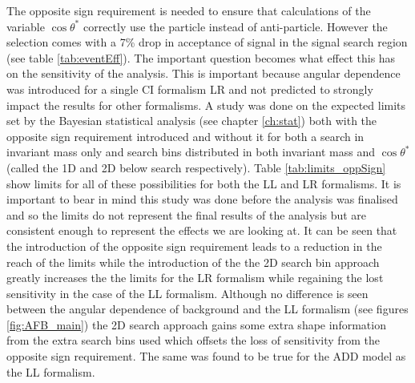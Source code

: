     The opposite sign requirement is needed to ensure that calculations of the variable $\cos{\theta^{*}}$  correctly use the particle instead of anti-particle. However the selection comes with a 7\% drop in acceptance of signal in the signal search region (see table \ref{tab:eventEff}). The important question becomes what effect this has on the sensitivity of the analysis. This is important because angular dependence was introduced for a single CI formalism LR and not predicted to strongly impact the results for other formalisms. 
    A study was done on the expected limits set by the Bayesian statistical analysis (see chapter \ref{ch:stat}) both with the opposite sign requirement introduced and without it for both a search in invariant mass only and search bins distributed in both invariant mass and $\cos{\theta^{*}}$ (called the 1D and 2D below search respectively). Table \ref{tab:limits_oppSign} show limits for all of these possibilities for both the LL and LR formalisms. It is important to bear in mind this study was done before the analysis was finalised and so the limits do not represent the final results of the analysis but are consistent enough to represent the effects we are looking at. It can be seen that the introduction of the opposite sign requirement leads to a reduction in the reach of the limits while the introduction of the the 2D search bin approach greatly increases the the limits for the LR formalism while regaining the lost sensitivity in the case of the LL formalism. Although no difference is seen between the angular dependence of background and the LL formalism (see figures \ref{fig:AFB_main}) the 2D search approach gains some extra shape information from the extra search bins used which offsets the loss of sensitivity from the opposite sign requirement. The same was found to be true for the ADD model as the LL formalism.  


